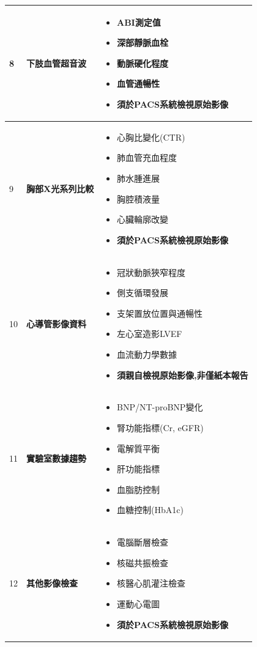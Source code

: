 \documentclass[12pt,a4paper]{article}
\begin{document}
\begin{longtable}{|p{1cm}|p{4.5cm}|p{8.5cm}|}
8 & \textbf{下肢血管超音波} & 
\begin{itemize}[nosep,leftmargin=*]
    \item ABI測定值
    \item 深部靜脈血栓
    \item 動脈硬化程度
    \item 血管通暢性
    \item \textbf{須於PACS系統檢視原始影像}
\end{itemize} \\
\hline

9 & \textbf{胸部X光系列比較} & 
\begin{itemize}[nosep,leftmargin=*]
    \item 心胸比變化(CTR)
    \item 肺血管充血程度
    \item 肺水腫進展
    \item 胸腔積液量
    \item 心臟輪廓改變
    \item \textbf{須於PACS系統檢視原始影像}
\end{itemize} \\
\hline

10 & \textbf{心導管影像資料} & 
\begin{itemize}[nosep,leftmargin=*]
    \item 冠狀動脈狹窄程度
    \item 側支循環發展
    \item 支架置放位置與通暢性
    \item 左心室造影LVEF
    \item 血流動力學數據
    \item \textbf{須親自檢視原始影像,非僅紙本報告}
\end{itemize} \\
\hline

11 & \textbf{實驗室數據趨勢} & 
\begin{itemize}[nosep,leftmargin=*]
    \item BNP/NT-proBNP變化
    \item 腎功能指標(Cr, eGFR)
    \item 電解質平衡
    \item 肝功能指標
    \item 血脂肪控制
    \item 血糖控制(HbA1c)
\end{itemize} \\
\hline

12 & \textbf{其他影像檢查} & 
\begin{itemize}[nosep,leftmargin=*]
    \item 電腦斷層檢查
    \item 核磁共振檢查
    \item 核醫心肌灌注檢查
    \item 運動心電圖
    \item \textbf{須於PACS系統檢視原始影像}
\end{itemize} \\
\hline

\end{longtable}
\end{document}
